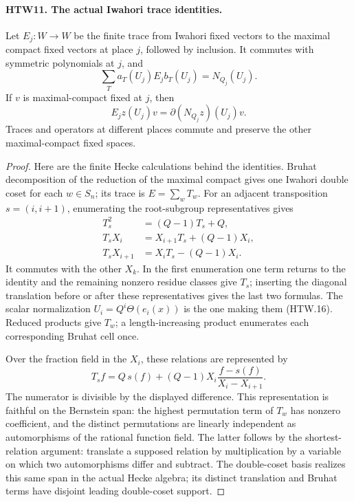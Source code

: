 \paragraph{HTW11. The actual Iwahori trace identities.}
\label{claim:HTW11}
Let \(E_j:W\to W\) be the finite trace from Iwahori
fixed vectors to the maximal compact fixed vectors
at place \(j\), followed by inclusion.  It commutes
with symmetric polynomials at \(j\), and
\[
 \sum_T a_T(U_j)E_jb_T(U_j)=N_{Q_j}(U_j).
 \tag{HTW.14}
\]
If \(v\) is maximal-compact fixed at \(j\), then
\[
 E_j z(U_j)v=\partial(N_{Q_j}z)(U_j)v .
 \tag{HTW.15}
\]
Traces and operators at different places commute and
preserve the other maximal-compact fixed spaces.
\begin{proof}
Here are the finite Hecke calculations behind the
identities.  Bruhat decomposition of the reduction of
the maximal compact gives one Iwahori double coset
for each \(w\in S_n\); its trace is \(E=\sum_wT_w\).
For an adjacent transposition \(s=(i,i+1)\), enumerating
the root-subgroup representatives gives
\[
 \begin{split}
 T_s^2&=(Q-1)T_s+Q,\\
 T_sX_i&=X_{i+1}T_s+(Q-1)X_i,\\
 T_sX_{i+1}&=X_iT_s-(Q-1)X_i .
 \end{split}
 \tag{HTW.16}
\]
It commutes with the other \(X_k\).  In the first
enumeration one term returns to the identity and the
remaining nonzero residue classes give \(T_s\);
inserting the diagonal translation before or after
these representatives gives the last two formulas.
The scalar normalization \(U_i=Q^i\Theta(e_i(x))\)
is the one making them (HTW.16).  Reduced products
give \(T_w\); a length-increasing product enumerates
each corresponding Bruhat cell once.

Over the fraction field in the \(X_i\), these relations
are represented by
\[
 T_sf=Q\,s(f)+(Q-1)X_i
                        \frac{f-s(f)}{X_i-X_{i+1}}.
 \tag{HTW.17}
\]
The numerator is divisible by the displayed difference.
This representation is faithful on the Bernstein span:
the highest permutation term of \(T_w\) has nonzero
coefficient, and the distinct permutations are linearly
independent as automorphisms of the rational function
field.  The latter follows by the shortest-relation
argument: translate a supposed relation by multiplication
by a variable on which two automorphisms differ and
subtract.  The double-coset basis realizes this same
span in the actual Hecke algebra; its distinct
translation and Bruhat terms have disjoint leading
double-coset support.


\end{proof}
